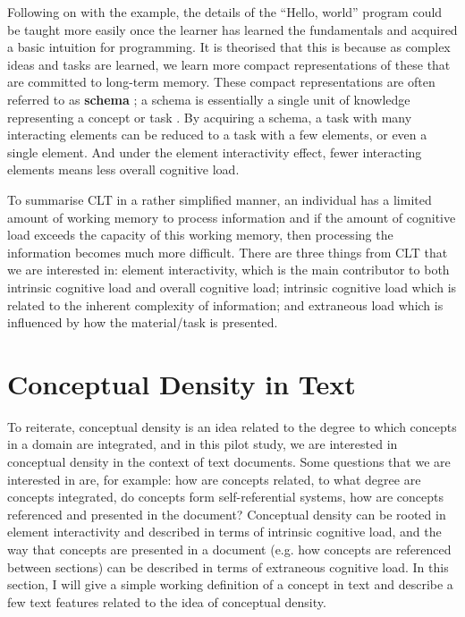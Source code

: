 \documentclass[12pt]{article}
\theoremstyle{grammarstyle}
\newcommand{\keyword}[1]{%
    \textbf{#1}%
}
\begin{document}
Following on with the example, the details of the ``Hello, world'' program could be taught more easily once the learner has learned the fundamentals and acquired a basic intuition for programming. It is theorised that this is because as complex ideas and tasks are learned, we learn more compact representations of these that are committed to long-term memory. These compact representations are often referred to as \keyword{schema}; a schema is essentially a single unit of knowledge representing a concept or task \citep{axelrod1973schema, abelson1981psychological, bartlett1995remembering}. By acquiring a schema, a task with many interacting elements can be reduced to a task with a few elements, or even a single element. And under the element interactivity effect, fewer interacting elements means less overall cognitive load.

To summarise CLT in a rather simplified manner, an individual has a limited amount of working memory to process information and if the amount of cognitive load exceeds the capacity of this working memory, then processing the information becomes much more difficult. There are three things from CLT that we are interested in: element interactivity, which is the main contributor to both intrinsic cognitive load and overall cognitive load; intrinsic cognitive load which is related to the inherent complexity of information; and extraneous load which is influenced by how the material/task is presented.

\section{Conceptual Density in Text} \label{sec:conceptual_density_in_text}
To reiterate, conceptual density is an idea related to the degree to which concepts in a domain are integrated, and in this pilot study, we are interested in conceptual density in the context of text documents. Some questions that we are interested in are, for example: how are concepts related, to what degree are concepts integrated, do concepts form self-referential systems, how are concepts referenced and presented in the document? Conceptual density can be rooted in element interactivity and described in terms of intrinsic cognitive load, and the way that concepts are presented in a document (e.g. how concepts are referenced between sections) can be described in terms of extraneous cognitive load. In this section, I will give a simple working definition of a concept in text and describe a few text features related to the idea of conceptual density.
\end{document}
